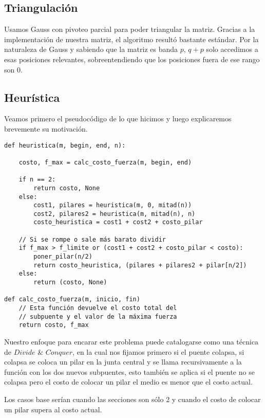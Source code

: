 \subsection{Triangulación}

Usamos Gauss con pivoteo parcial para poder triangular la matriz. Gracias a la implementación de nuestra matriz, el algoritmo resultó bastante estándar. Por la naturaleza de Gauss y sabiendo que la matriz es banda $p$, $q + p$ solo accedimos a esas posiciones relevantes, sobreentendiendo que los posiciones fuera de ese rango son $0$.

\subsection{Heurística}

Veamos primero el pseudocódigo de lo que hicimos y luego explicaremos brevemente su motivación.
\begin{verbatim}
def heuristica(m, begin, end, n):

    costo, f_max = calc_costo_fuerza(m, begin, end)

    if n == 2:
        return costo, None
    else:
        cost1, pilares = heuristica(m, 0, mitad(n))
        cost2, pilares2 = heuristica(m, mitad(n), n)
        costo_heuristica = cost1 + cost2 + costo_pilar

    // Si se rompe o sale más barato dividir
    if f_max > f_limite or (cost1 + cost2 + costo_pilar < costo):
        poner_pilar(n/2)
        return costo_heuristica, (pilares + pilares2 + pilar[n/2])
    else:
        return (costo, None)
                        
def calc_costo_fuerza(m, inicio, fin)
    // Esta función devuelve el costo total del
    // subpuente y el valor de la máxima fuerza
    return costo, f_max
\end{verbatim}

Nuestro enfoque para encarar este problema puede catalogarse como una técnica de $Divide$ $\&$ $Conquer$, en la cual nos fijamos primero si el puente colapsa, si colapsa se coloca un pilar en la junta central y se llama recursivamente a la función con los dos nuevos subpuentes, esto también se aplica si el puente no se colapsa pero el costo de colocar un pilar el medio es menor que el costo actual.

Los casos base serían cuando las secciones son sólo 2 y cuando el costo de colocar un pilar supera al costo actual.
